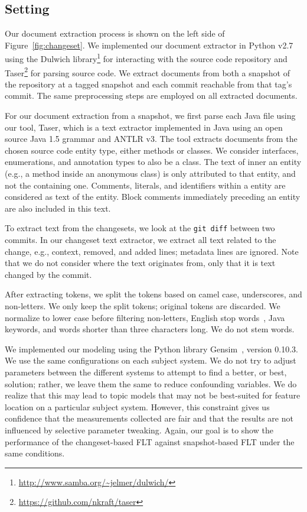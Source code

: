 \subsection{Setting}

Our document extraction process is shown on the left side of
Figure~\ref{fig:changeset}.  We implemented our document extractor in Python
v2.7 using the Dulwich
library\footnote{\url{http://www.samba.org/~jelmer/dulwich/}} for interacting
with the source code repository and
Taser\footnote{\url{https://github.com/nkraft/taser}} for parsing source code.
We extract documents from both a snapshot of the repository at a tagged snapshot
and each commit reachable from that tag's commit.  The same preprocessing steps
are employed on all extracted documents.

For our document extraction from a snapshot, we first parse each Java file using
our tool, Taser, which is a text extractor implemented in Java using an open
source Java 1.5 grammar and ANTLR v3.  The tool extracts documents from the
chosen source code entity type, either methods or classes.  We consider
interfaces, enumerations, and annotation types to also be a class.  The text of
inner an entity (e.g., a method inside an anonymous class) is only attributed to
that entity, and not the containing one.  Comments, literals, and identifiers
within a entity are considered as text of the entity.  Block comments
immediately preceding an entity are also included in this text.

To extract text from the changesets, we look at the \texttt{git diff} between
two commits.  In our changeset text extractor, we extract all text related to
the change, e.g., context, removed, and added lines; metadata lines are ignored.
Note that we do not consider where the text originates from, only that it is
text changed by the commit.

After extracting tokens, we split the tokens based on camel case, underscores,
and non-letters.  We only keep the split tokens; original tokens are discarded.
We normalize to lower case before filtering non-letters, English stop
words~\cite{Fox_1992}, Java keywords, and words shorter than three characters
long.  We do not stem words.

We implemented our modeling using the Python library
Gensim~\cite{Rehurek-Sojk_2010}, version 0.10.3. We use the same configurations
on each subject system.  We do not try to adjust parameters between the
different systems to attempt to find a better, or best, solution; rather, we
leave them the same to reduce confounding variables.  We do realize that this
may lead to topic models that may not be best-suited for feature location on a
particular subject system.  However, this constraint gives us confidence that
the measurements collected are fair and that the results are not influenced by
selective parameter tweaking.  Again, our goal is to show the performance of the
changeset-based FLT against snapshot-based FLT under the same conditions.

